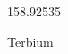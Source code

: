 \documentclass[12pt]{article}
\begin{document}
\hfill{}
\vfill
\begin{center}
  {\fontsize{50}{60}
  }

  \vspace{1em}

  158.92535

Terbium
\end{center}
\vfill
\end{document}
